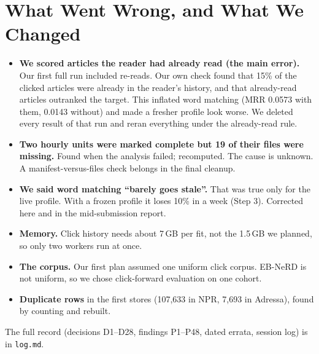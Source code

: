 \documentclass[11pt,a4paper]{article}
\begin{document}
\section{What Went Wrong, and What We Changed}\label{sec:wrong}
\begin{itemize}
\item \textbf{We scored articles the reader had already read (the main error).} Our first full run included re-reads. Our own check found that 15\% of the clicked articles were already in the reader's history, and that already-read articles outranked the target. This inflated word matching (MRR 0.0573 with them, 0.0143 without) and made a fresher profile look worse. We deleted every result of that run and reran everything under the already-read rule.
\item \textbf{Two hourly units were marked complete but 19 of their files were missing.} Found when the analysis failed; recomputed. The cause is unknown. A manifest-versus-files check belongs in the final cleanup.
\item \textbf{We said word matching ``barely goes stale''.} That was true only for the live profile. With a frozen profile it loses 10\% in a week (Step 3). Corrected here and in the mid-submission report.
\item \textbf{Memory.} Click history needs about 7\,GB per fit, not the 1.5\,GB we planned, so only two workers run at once.
\item \textbf{The corpus.} Our first plan assumed one uniform click corpus. EB-NeRD is not uniform, so we chose click-forward evaluation on one cohort.
\item \textbf{Duplicate rows} in the first stores (107,633 in NPR, 7,693 in Adressa), found by counting and rebuilt.
\end{itemize}
The full record (decisions D1--D28, findings P1--P48, dated errata, session log) is in \texttt{log.md}.

\end{document}
